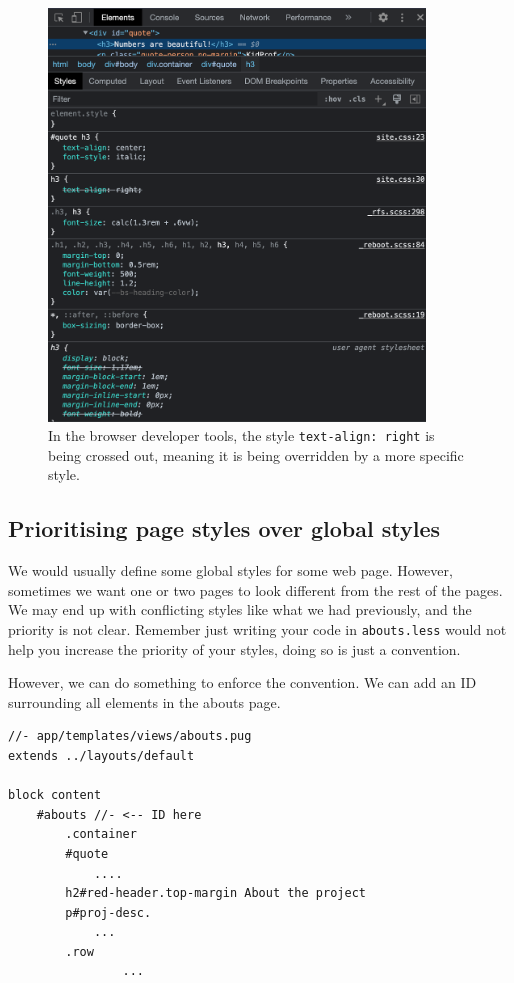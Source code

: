 \begin{figure}[h]
\centering
\includegraphics[width=10cm]{images/chn6-stylingpriority.png}
\caption{In the browser developer tools, the style \texttt{text-align: right} is being crossed out, meaning it is being overridden by a more specific style.}
\end{figure}

\subsection*{Prioritising page styles over global styles}

We would usually define some global styles for some web page. However, sometimes we want one or two pages to look different from the rest of the pages. We may end up with conflicting styles like what we had previously, and the priority is not clear. Remember just writing your code in \texttt{abouts.less} would not help you increase the priority of your styles, doing so is just a convention.  

However, we can do something to enforce the convention. We can add an ID surrounding all elements in the abouts page.

\begin{lstlisting}[language=pug]
//- app/templates/views/abouts.pug
extends ../layouts/default

block content
    #abouts //- <-- ID here
        .container 
    	#quote
    		....
    	h2#red-header.top-margin About the project
    	p#proj-desc.
    		...
    	.row
                ...
\end{lstlisting}

